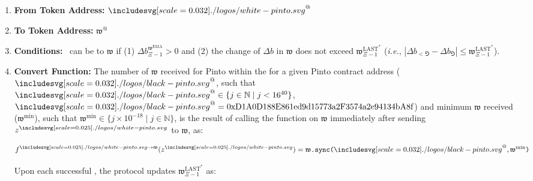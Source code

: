 \documentclass[class=article, crop=false]{standalone}
\begin{document}
\begin{enumerate}

    \item \textbf{From Token Address:} $\Pinto^{@}$
    
    \item \textbf{To Token Address:} $\mathfrak{w}^{@}$ 
    
    \item \textbf{Conditions:}  \Pinto\ can be  to  $\mathfrak{w}$ if (1) $\Delta b_{\Xi-1}^{\mathfrak{w}^{\text{EMA}}} > 0$ and (2) the change of $\Delta b$ in $\mathfrak{w}$ does not exceed $\mathfrak{w}_{\Xi-1}^{\text{LAST}^{*}}$ (\textit{i.e.}, $|\Delta b_{<\Game} - \Delta b_{\Game}| \leq \mathfrak{w}_{\Xi-1}^{\text{LAST}^{*}}$).
    
    \item \textbf{Convert Function:} The number of $\mathfrak{w}$ received for   Pinto within the  for a given Pinto contract address ($\PintoContract^{@}$, such that $\PintoContract^{@} \in \{j \in \mathbb{N} \mid j < 16^{40} \}$, $\PintoContract^{@} = \\ \text{0xD1A0D188E861ed9d15773a2F3574a2e94134bA8f}$) and minimum $\mathfrak{w}$ received ($\mathfrak{w}^{\text{min}}$), such that $\mathfrak{w}^{\text{min}} \in \{j \times 10^{-18} \mid j \in \mathbb{N} \}$, is the result of calling the   function on $\mathfrak{w}$ immediately after sending $z^{\pinto}$ to $\mathfrak{w}$, as:
    
        $$
            f^{\pinto \rightarrow \mathfrak{w}}(z^{\pinto}) = 
                \mathfrak{w} \code{.sync(}
                            \PintoContract^{@},
                            \mathfrak{w}^{\text{min}}
                        \code{)}
        $$

    Upon each successful , the protocol updates $\mathfrak{w}_{\Xi-1}^{\text{LAST}^{*}}$ as:


\end{enumerate}
\end{document}
